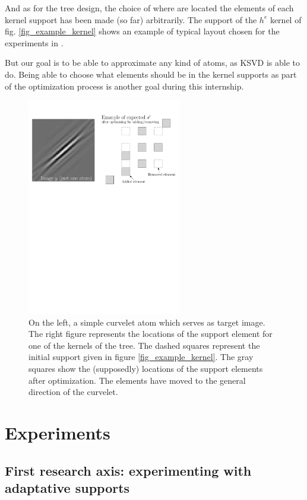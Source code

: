 And as for the tree design, the choice of where are located the elements of each kernel support has been made (so far) arbitrarily. The support of the $h^e$ kernel of fig. \ref{fig_example_kernel} shows an example of typical layout chosen for the experiments in \cite{chabiron_optimization_2016}. 

But our goal is to be able to approximate any kind of atoms, as \ac{KSVD} is able to do. Being able to choose what elements should be in the kernel supports as part of the optimization process is another goal during this internship.

\begin{figure}[!ht] \centering
\includegraphics[width=0.6\textwidth]{figures/add-rm-elmts-support.pdf}
\caption{On the left, a simple curvelet atom which serves as target image. The right figure represents the locations of the support element for one of the kernels of the tree. The dashed squares represent the initial support given in figure \ref{fig_example_kernel}. The gray squares show the (supposedly) locations of the support elements after optimization. The elements have moved to the general direction of the curvelet.\label{fig_example_optimal_support}}
\end{figure}

\chapter{Experiments}

\section{First research axis: experimenting with adaptative supports}

